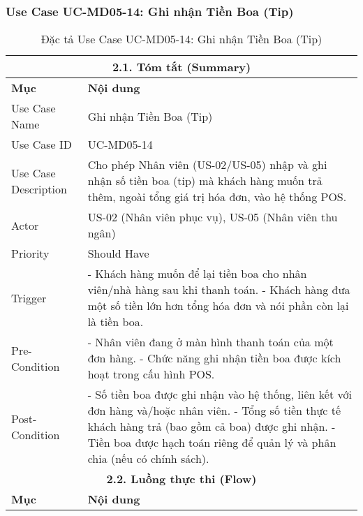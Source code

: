 \subsubsection{Use Case UC-MD05-14: Ghi nhận Tiền Boa (Tip)}
\begin{longtable}{|m{4cm}|p{11cm}|}
\caption{Đặc tả Use Case UC-MD05-14: Ghi nhận Tiền Boa (Tip)} \label{tab:uc_md05_14_final} \\
\hline
\multicolumn{2}{|c|}{\textbf{2.1. Tóm tắt (Summary)}} \\
\hline
\textbf{Mục} & \textbf{Nội dung} \\
\hline
\endhead %
\hline
\endfoot %
\hline
\endlastfoot %
Use Case Name & Ghi nhận Tiền Boa (Tip) \\
\hline
Use Case ID & UC-MD05-14 \\
\hline
Use Case Description & Cho phép Nhân viên (US-02/US-05) nhập và ghi nhận số tiền boa (tip) mà khách hàng muốn trả thêm, ngoài tổng giá trị hóa đơn, vào hệ thống POS. \\
\hline
Actor & US-02 (Nhân viên phục vụ), US-05 (Nhân viên thu ngân) \\
\hline
Priority & Should Have \\
\hline
Trigger & - Khách hàng muốn để lại tiền boa cho nhân viên/nhà hàng sau khi thanh toán. \newline - Khách hàng đưa một số tiền lớn hơn tổng hóa đơn và nói phần còn lại là tiền boa. \\
\hline
Pre-Condition & - Nhân viên đang ở màn hình thanh toán của một đơn hàng. \newline - Chức năng ghi nhận tiền boa được kích hoạt trong cấu hình POS. \\
\hline
Post-Condition & - Số tiền boa được ghi nhận vào hệ thống, liên kết với đơn hàng và/hoặc nhân viên. \newline - Tổng số tiền thực tế khách hàng trả (bao gồm cả boa) được ghi nhận. \newline - Tiền boa được hạch toán riêng để quản lý và phân chia (nếu có chính sách). \\
\hline
\multicolumn{2}{|c|}{\textbf{2.2. Luồng thực thi (Flow)}} \\
\hline
\textbf{Mục} & \textbf{Nội dung} \\
\hline

\end{longtable}
